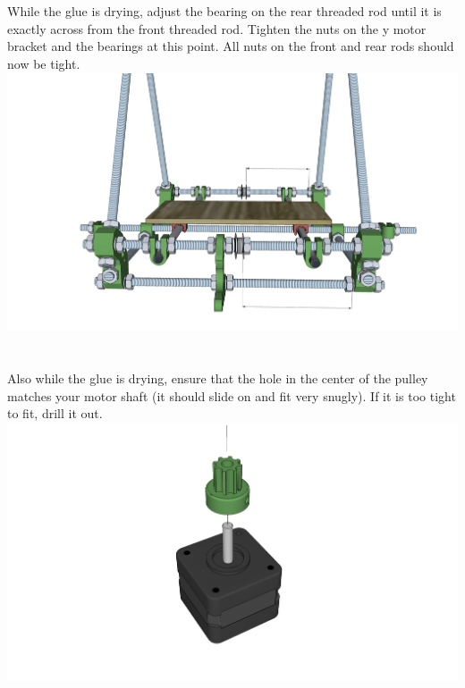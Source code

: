 \documentclass[twoside,a4paper,titlepage]{memoir}
\begin{document}
	\section{}
	While the glue is drying, adjust the bearing on the rear threaded rod until it is exactly across from the
	front threaded rod. Tighten the nuts on the y motor bracket and the bearings at this point. All nuts on the
	front and rear rods should now be tight.\\
	\includegraphics[width=1\linewidth]{graphics/ch6_12.png}
	
	\section{}
	Also while the glue is drying, ensure that the hole in the center of the pulley matches your motor shaft (it
	should slide on and fit very snugly). If it is too tight to fit, drill it out.\\
	\includegraphics[width=1\linewidth]{graphics/ch6_13.png}
	
\end{document}

